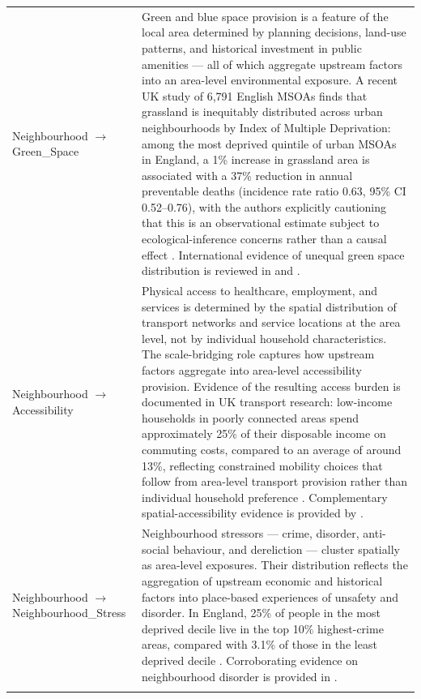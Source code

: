 \begin{longtable}{@{}p{3.8cm}p{11.2cm}@{}}
Neighbourhood $\to$ Green\_Space & Green and blue space provision is a feature of the local area determined by planning decisions, land-use patterns, and historical investment in public amenities --- all of which aggregate upstream factors into an area-level environmental exposure. A recent UK study of 6{,}791 English MSOAs finds that grassland is inequitably distributed across urban neighbourhoods by Index of Multiple Deprivation: among the most deprived quintile of urban MSOAs in England, a 1\% increase in grassland area is associated with a 37\% reduction in annual preventable deaths (incidence rate ratio 0.63, 95\% CI 0.52--0.76), with the authors explicitly cautioning that this is an observational estimate subject to ecological-inference concerns rather than a causal effect \citep{ngan_inequality_2024}. International evidence of unequal green space distribution is reviewed in \citet{astell-burt_low-income_2014} and \citet{hoffimann_socioeconomic_2017}. \\
\addlinespace
Neighbourhood $\to$ Accessibility & Physical access to healthcare, employment, and services is determined by the spatial distribution of transport networks and service locations at the area level, not by individual household characteristics. The scale-bridging role captures how upstream factors aggregate into area-level accessibility provision. Evidence of the resulting access burden is documented in UK transport research: low-income households in poorly connected areas spend approximately 25\% of their disposable income on commuting costs, compared to an average of around 13\%, reflecting constrained mobility choices that follow from area-level transport provision rather than individual household preference \citep{lucas_inequalities_2019}. Complementary spatial-accessibility evidence is provided by \citet{moreno-monroy_public_2024}. \\
\addlinespace
Neighbourhood $\to$ Neighbourhood\_Stress & Neighbourhood stressors --- crime, disorder, anti-social behaviour, and dereliction --- cluster spatially as area-level exposures. Their distribution reflects the aggregation of upstream economic and historical factors into place-based experiences of unsafety and disorder. In England, 25\% of people in the most deprived decile live in the top 10\% highest-crime areas, compared with 3.1\% of those in the least deprived decile \citep{the_health_foundation_inequalities_2024}. Corroborating evidence on neighbourhood disorder is provided in \citet{polling_influence_2014}. \\
\addlinespace

\end{longtable}
